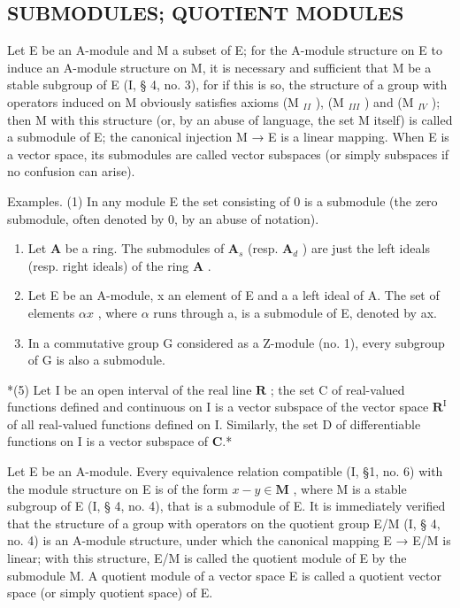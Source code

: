 \subsection{SUBMODULES; QUOTIENT MODULES}

Let E be an A-module and M a subset of E; for the A-module structure on E to induce an A-module structure on M, it is necessary and sufficient that M be a stable subgroup of E (I, § 4, no. 3), for if this is so, the structure of a group with operators induced on M obviously satisfies axioms (M \(_{II}\) ), (M \(_{III}\) ) and (M \(_{IV}\) ); then M with this structure (or, by an abuse of language, the set M itself) is called a submodule of E; the canonical injection M → E is a linear mapping. When E is a vector space, its submodules are called vector subspaces (or simply subspaces if no confusion can arise).

Examples. (1) In any module E the set consisting of 0 is a submodule (the zero submodule, often denoted by 0, by an abuse of notation).

\begin{enumerate}
\def\labelenumi{(\arabic{enumi})}
\setcounter{enumi}{1}
\item
  Let \(\mathbf{A}\) be a ring. The submodules of \(\mathbf{A}_s\) (resp. \(\mathbf{A}_d\) ) are just the left ideals (resp. right ideals) of the ring \(\mathbf{A}\) .
\item
  Let E be an A-module, x an element of E and a a left ideal of A. The set of elements \(\alpha x\) , where \(\alpha\) runs through a, is a submodule of E, denoted by ax.
\item
  In a commutative group G considered as a Z-module (no. 1), every subgroup of G is also a submodule.
\end{enumerate}

*(5) Let I be an open interval of the real line \(\mathbf{R}\) ; the set C of real-valued functions defined and continuous on I is a vector subspace of the vector space \(\mathbf{R}^{\mathrm{I}}\) of all real-valued functions defined on I. Similarly, the set D of differentiable functions on I is a vector subspace of \(\mathbf{C}\).*

Let E be an A-module. Every equivalence relation compatible (I, §1, no. 6) with the module structure on E is of the form \(x - y \in \mathbf{M}\) , where M is a stable subgroup of E (I, § 4, no. 4), that is a submodule of E. It is immediately verified that the structure of a group with operators on the quotient group E/M (I, § 4, no. 4) is an A-module structure, under which the canonical mapping E → E/M is linear; with this structure, E/M is called the quotient module of E by the submodule M. A quotient module of a vector space E is called a quotient vector space (or simply quotient space) of E.

